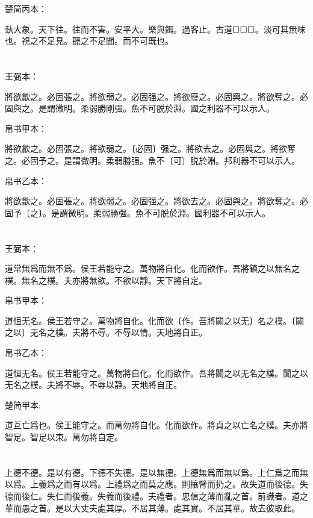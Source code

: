 \documentclass[a5paper]{ctexbook}
\begin{document}
    楚简丙本：

    埶大象。天下往。往而不害。安平大。樂與餌。過客止。古道☐☐☐。淡可其無味也。視之不足見。聽之不足聞。而不可既也。

    \chapter{}
    王弼本：

    將欲歙之。必固張之。將欲弱之。必固强之。將欲廢之。必固興之。將欲奪之。必固與之。是謂微明。柔弱勝剛强。魚不可脱於淵。國之利器不可以示人。

    
    帛书甲本：

    將欲歙之。必固張之。將欲弱之。〔必固〕强之。將欲去之。必固與之。將欲奪之。必固予之。是謂微明。柔弱勝强。魚不〔可〕脱於淵。邦利器不可以示人。

    帛书乙本：

    將欲歙之。必固張之。將欲弱之。必固强之。將欲去之。必固與之。將欲奪之。必固予〔之〕。是謂微明。柔弱勝强。魚不可脱於淵。國利器不可以示人。

    \chapter{}
    王弼本：

    道常無爲而無不爲。侯王若能守之。萬物將自化。化而欲作。吾將鎮之以無名之樸。無名之樸。夫亦將無欲。不欲以靜。天下將自定。

    
    帛书甲本：

    道恒无名。侯王若守之。萬物將自化。化而欲〔作。吾將闐之以无〕名之樸。〔闐之以〕无名之樸。夫將不辱。不辱以情。天地將自正。

    帛书乙本：

    道恒无名。侯王若能守之。萬物將自化。化而欲作。吾將闐之以无名之樸。闐之以无名之樸。夫將不辱。不辱以静。天地將自正。

    楚简甲本:

    道互亡爲也。侯王能守之。而萬勿將自化。化而欲作。將貞之以亡名之樸。夫亦將智足。智足以朿。萬勿將自定。

    \chapter{}

    上德不德。是以有德。下德不失德。是以無德。上德無爲而無以爲。上仁爲之而無以爲。上義爲之而有以爲。上禮爲之而莫之應。則攘臂而扔之。故失道而後德。失德而後仁。失仁而後義。失義而後禮。夫禮者。忠信之薄而亂之首。前識者。道之華而愚之首。是以大丈夫處其厚。不居其薄。處其實。不居其華。故去彼取此。
\end{document}
